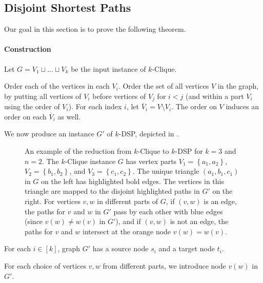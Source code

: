 \documentclass[11pt]{article}
\newcommand{\set}[1]{\left\{#1\right\}}
\renewcommand{\bar}{\overline}
\theoremstyle{definition}
\begin{document}
\subsection{Disjoint Shortest Paths}

Our goal in this section is to prove the following theorem. 

\lbdspboth*



\paragraph{Construction}

Let $G = V_1\sqcup \dots\sqcup V_k$ be the input instance of \textsf{$k$-Clique}.

Order each of the vertices in each $V_i$.
Order the set of all vertices $V$ in the graph, by putting all vertices of $V_i$ before vertices of $V_j$ for $i < j$ (and within a part $V_i$ using the order of $V_i$).
For each index $i$, let $\bar{V}_i = V\setminus V_i$.
The order on $V$ induces an order on each $\bar{V}_i$ as well.

We now produce an instance $G'$ of \textsf{$k$-DSP}, depicted in .

\begin{figure}[t]
    \centering
    
    \caption{An example of the reduction from \textsf{$k$-Clique} to \textsf{$k$-DSP} for $k=3$ and $n=2$.
    The \textsf{$k$-Clique} instance $G$ has vertex parts $V_1 = \set{a_1, a_2}$, $V_2 = \set{b_1, b_2}$, and $V_3 = \set{c_1, c_2}$. 
    The unique triangle $(a_1,b_1,c_1)$ in $G$ on the left has  highlighted bold edges. The vertices in this triangle are mapped to the disjoint highlighted paths in $G'$ on the right. For vertices $v,w$ in different parts of $G$, if $(v,w)$ is an edge, the paths for $v$ and $w$ in $G'$ pass by each other with blue edges (since $v(w)\neq w(v)$ in $G'$), and if $(v,w)$ is not an edge, the paths for $v$ and $w$ intersect at the orange node $v(w) = w(v)$. }
    \label{fig:dsp-reduction}
\end{figure}

For each $i\in[k]$, graph $G'$ has a source node $s_i$ and a target node $t_i$.

For each choice of vertices $v,w$ from different parts, we introduce node $v(w)$ in $G'$.
\end{document}
